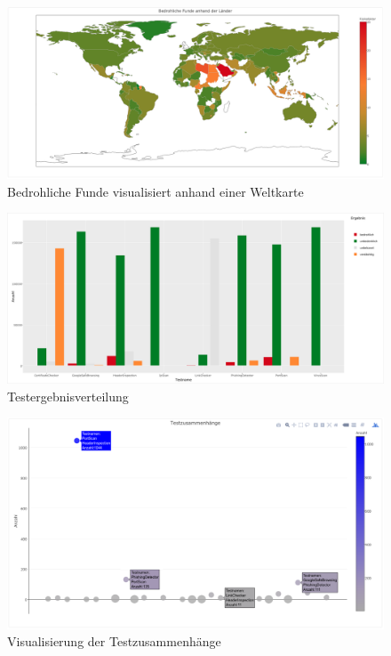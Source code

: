 \begin{landscape}
\begin{figure}[H]
  \centering
  \includegraphics[width=\textheight]{images/stats/weltkarte}
  \caption{Bedrohliche Funde visualisiert anhand einer Weltkarte}
\end{figure}

\begin{figure}[H]
  \centering
  \includegraphics[width=\textheight]{images/stats/ergebnisverteilung}
  \caption{Testergebnisverteilung}
\end{figure}

\begin{figure}[H]
  \centering
  \includegraphics[width=\textheight]{images/stats/testzusammenhaenge}
  \caption{Visualisierung der Testzusammenhänge}
\end{figure}


\end{landscape}
